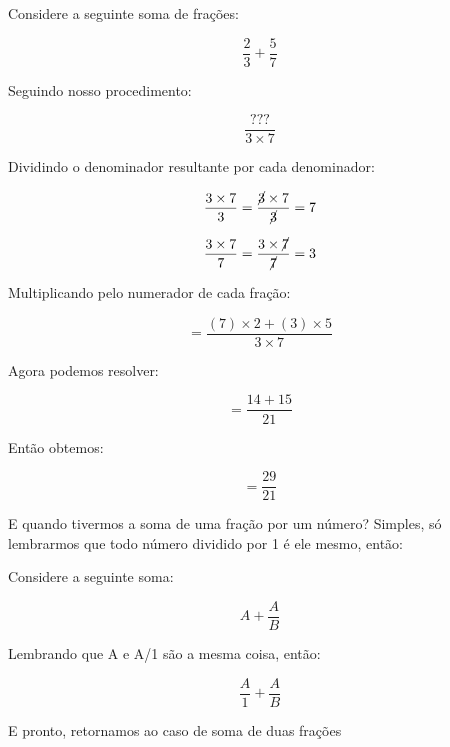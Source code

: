 \begin{exemplo}
    Considere a seguinte soma de frações:

    \begin{equation}
        \frac{2}{3}+\frac{5}{7}
    \end{equation}

    Seguindo nosso procedimento:

    \begin{equation}
        \frac{???}{3\times7}
    \end{equation}

    Dividindo o denominador resultante por cada denominador:
    
    \begin{equation}
        \frac{3\times7}{3}=\frac{\cancel{3}\times7}{\cancel{3}}=7
    \end{equation}

    \begin{equation}
        \frac{3\times7}{7}=\frac{3\times\cancel{7}}{\cancel{7}}=3
    \end{equation}

    Multiplicando pelo numerador de cada fração:

    \begin{equation}
        =\frac{(7)\times2+(3)\times5}{3\times7}
    \end{equation}

    Agora podemos resolver:

    \begin{equation}
        =\frac{14+15}{21}
    \end{equation}

    Então obtemos:
    
    \begin{equation}
        =\frac{29}{21}
    \end{equation}
\end{exemplo}

E quando tivermos a soma de uma fração por um número? Simples, só lembrarmos que todo número dividido por 1 é ele mesmo, então:

\begin{tcolorbox}[title=Soma de fração e número]
    Considere a seguinte soma:

    \begin{equation}
        A + \frac{A}{B}
    \end{equation}

    Lembrando que A e A/1 são a mesma coisa, então:

    \begin{equation}
        \frac{A}{1} + \frac{A}{B}
    \end{equation}

    E pronto, retornamos ao caso de soma de duas frações
\end{tcolorbox}

